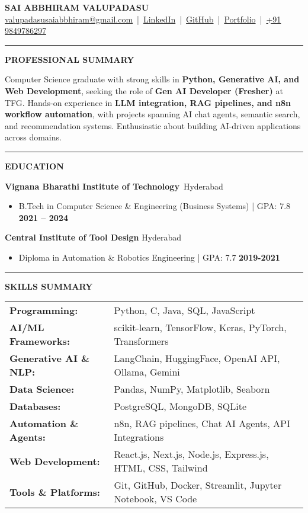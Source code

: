 \documentclass[11pt,a4paper]{article}
\newcommand{\resumesection}[1]{
	\vspace{0.2cm}
	\hrule
	\vspace{0.2cm}
	\centerline{\large\textbf{#1}}
	\vspace{0.15cm}
}
\begin{document}
	
	
	\noindent
	\begin{center}
		\textbf{\Huge SAI ABBHIRAM VALUPADASU} \\[0.3em]
		\href{mailto:valupadasusaiabbhiram@gmail.com}{valupadasusaiabbhiram@gmail.com} \,|\, 
		\href{https://www.linkedin.com/in/sai-abbhiram-valupadasu/}{LinkedIn} \,|\, 
		\href{https://github.com/ValupadasuSaiAbbhiram}{GitHub} \,|\, 
		\href{https://saiabbhiram-portfolio.vercel.app}{Portfolio} \,|\, 
		\href{tel:+919849786297}{+91 9849786297}
	\end{center}
	
	
	\resumesection{PROFESSIONAL SUMMARY}
	\noindent
	Computer Science graduate with strong skills in \textbf{Python, Generative AI, and Web Development}, seeking the role of \textbf{Gen AI Developer (Fresher)} at TFG. Hands-on experience in \textbf{LLM integration, RAG pipelines, and n8n workflow automation}, with projects spanning AI chat agents, semantic search, and recommendation systems. Enthusiastic about building AI-driven applications across domains.
	
	
	\resumesection{EDUCATION}
	\noindent \textbf{Vignana Bharathi Institute of Technology}\ \hfill Hyderabad
	\begin{itemize}
		\item B.Tech in Computer Science \& Engineering (Business Systems) | GPA: 7.8 \textbf{\hfill 2021 -- 2024}
	\end{itemize}
	
	\noindent \textbf{Central Institute of Tool Design} \hfill Hyderabad
	\begin{itemize}
		\item Diploma in Automation \& Robotics Engineering | GPA: 7.7 \textbf{\hfill 2019-2021}
	\end{itemize}
	
	
	\resumesection{SKILLS SUMMARY}
	\noindent \begin{tabularx}{\textwidth}{@{}lX@{}}
		\textbf{Programming:} & Python, C, Java, SQL, JavaScript \\
		\textbf{AI/ML Frameworks:} & scikit-learn, TensorFlow, Keras, PyTorch, Transformers \\
		\textbf{Generative AI \& NLP:} & LangChain, HuggingFace, OpenAI API, Ollama, Gemini \\
		\textbf{Data Science:} & Pandas, NumPy, Matplotlib, Seaborn \\
		\textbf{Databases:} & PostgreSQL, MongoDB, SQLite \\
		\textbf{Automation \& Agents:} & n8n, RAG pipelines, Chat AI Agents, API Integrations \\
		\textbf{Web Development:} & React.js, Next.js, Node.js, Express.js, HTML, CSS, Tailwind \\
		\textbf{Tools \& Platforms:} & Git, GitHub, Docker, Streamlit, Jupyter Notebook, VS Code \\
	\end{tabularx}
	
\end{document}
